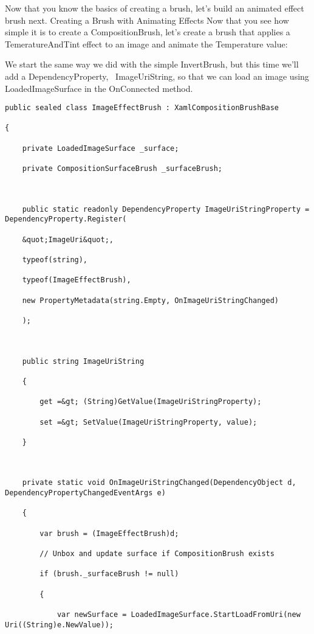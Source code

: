 Now that you know the basics of creating a brush, let’s build an animated effect brush next.
Creating a Brush with Animating Effects
Now that you see how simple it is to create a CompositionBrush, let’s create a brush that applies a TemeratureAndTint effect to an image and animate the Temperature value:

We start the same way we did with the simple InvertBrush, but this time we’ll add a DependencyProperty,  ImageUriString, so that we can load an image using LoadedImageSurface in the OnConnected method.



\begin{lstlisting}[style=CSharpStyle]
public sealed class ImageEffectBrush : XamlCompositionBrushBase

{
	
	private LoadedImageSurface _surface;
	
	private CompositionSurfaceBrush _surfaceBrush;
	
	
	
	public static readonly DependencyProperty ImageUriStringProperty = DependencyProperty.Register(
	
	&quot;ImageUri&quot;,
	
	typeof(string),
	
	typeof(ImageEffectBrush),
	
	new PropertyMetadata(string.Empty, OnImageUriStringChanged)
	
	);
	
	
	
	public string ImageUriString
	
	{
		
		get =&gt; (String)GetValue(ImageUriStringProperty);
		
		set =&gt; SetValue(ImageUriStringProperty, value);
		
	}
	
	
	
	private static void OnImageUriStringChanged(DependencyObject d, DependencyPropertyChangedEventArgs e)
	
	{
		
		var brush = (ImageEffectBrush)d;
		
		// Unbox and update surface if CompositionBrush exists     
		
		if (brush._surfaceBrush != null)
		
		{
			
			var newSurface = LoadedImageSurface.StartLoadFromUri(new Uri((String)e.NewValue));
			

\end{lstlisting}
